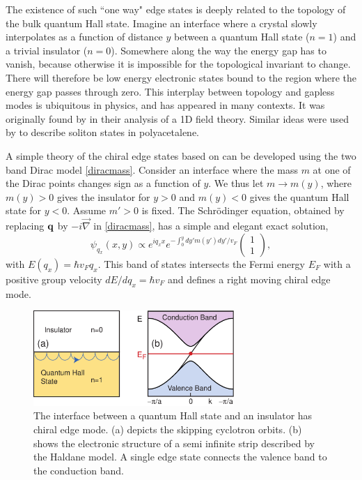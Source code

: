 \documentclass[twocolumn,floatfix,showpacs,rmp,aps]{revtex4}
\begin{document}
The existence
of such ``one way" edge states is deeply related to the topology of
the bulk quantum Hall state.
Imagine an interface where a crystal slowly interpolates as a
function of distance $y$
between a quantum Hall state ($n=1$) and a trivial insulator
($n=0$).  Somewhere along the way the energy gap has to vanish,
because otherwise it is impossible for the topological invariant to
change.  There will therefore be low energy electronic states bound
to the region where the energy gap passes through zero.  This interplay
between topology and gapless modes is
ubiquitous in physics, and has appeared in many contexts.
It was originally found by \textcite{jackiw76} in their analysis of
a 1D field theory.  Similar ideas were used by
\textcite{su79} to describe soliton states in polyacetalene.

A simple theory of the chiral edge states based on \textcite{jackiw76}
can be developed using the
two band Dirac model \eqref{diracmass}.  Consider an interface where
the mass $m$ at one of the Dirac points changes sign as a function of $y$.
We thus let $m \rightarrow m(y)$, where $m(y)>0$ gives the
insulator for $y>0$ and $m(y)<0$ gives the quantum Hall state for $y<0$.
Assume $m'>0$ is fixed.  The
Schr\"odinger equation, obtained by replacing ${\bf q}$ by
$-i \vec\nabla$ in \eqref{diracmass}, has a simple and elegant exact
solution,
\begin{equation}
\psi_{q_x}(x,y) \propto e^{i q_x x} e^{-\int_0^y dy' m(y') dy'/v_F}
\left(\begin{array}{c} 1\\1 \end{array}\right),
\label{jackiwrebbi}
\end{equation}
with $E(q_x) = \hbar v_F q_x$.  This band of states intersects the
Fermi energy $E_F$ with a positive group velocity $dE/dq_x = \hbar
v_F$ and defines a right moving chiral edge mode.

\begin{figure}
\includegraphics[width=3in]{Fig2}
\caption{The interface between a quantum Hall state and an insulator has chiral edge mode.
(a) depicts the skipping cyclotron orbits.  (b) shows the electronic structure of a semi infinite
strip described by the Haldane model.  A single edge state connects the valence band to the
conduction band.}
\label{fig:qhalledge}
\end{figure}
\end{document}
